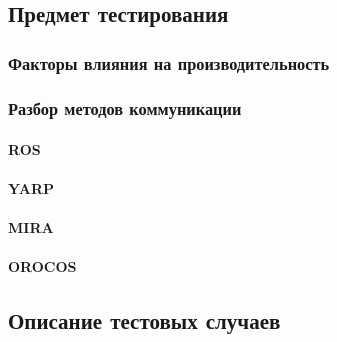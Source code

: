 \chapter{}
\label{title:chapter2}

\section{Предмет тестирования}
\label{title:chapter2:performance_subject}
	\subsection{Факторы влияния на производительность \marm{}}
	\label{title:chapter2:performance_factors}
	
	
	\subsection{Разбор методов коммуникации \marm{}}
	\label{title:chapter2:performance_approaches}
		\subsubsection{ROS}
		\label{title:chapter2:performance_ros_approaches}
		
		
		\subsubsection{YARP}
		\label{title:chapter2:performance_yarp_approaches}
		

		\subsubsection{MIRA}
		\label{title:chapter2:performance_mira_approaches}
		
		
		\subsubsection{OROCOS}
		\label{title:chapter2:performance_orocos_approaches}
		

\section{Описание тестовых случаев}
\label{title:chapter2:performance_test_cases}

	
